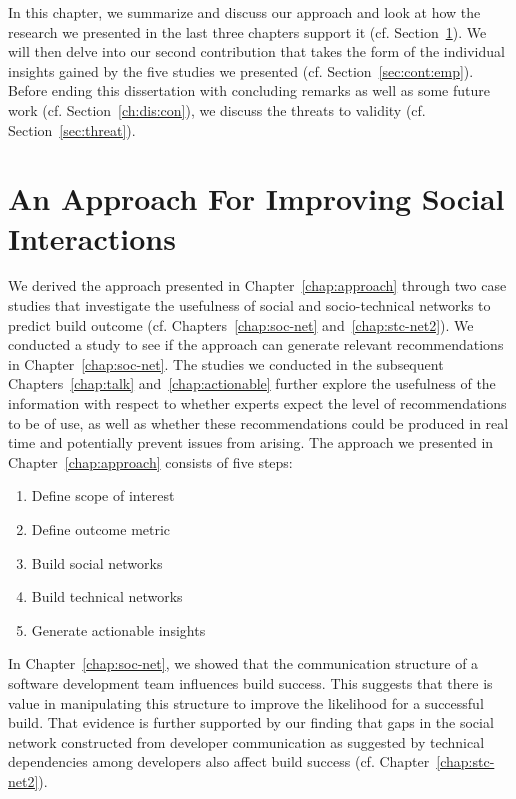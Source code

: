\label{chap:disc}
\vspace{-5pt}
In this chapter, we summarize and discuss our approach and look at how the research we presented in the last three chapters support it (cf. Section~\ref{ch:dis:app}).
We will then delve into our second contribution that takes the form of the individual insights gained by the five studies we presented (cf. Section~\ref{sec:cont:emp}).
Before ending this dissertation with concluding remarks as well as some future work (cf. Section~\ref{ch:dis:con}), we discuss the threats to validity (cf. Section~\ref{sec:threat}).

\vspace{-5pt}
\section{An Approach For Improving Social Interactions}
\label{ch:dis:app}
\vspace{-5pt}
We derived the approach presented in Chapter~\ref{chap:approach} through two case studies that investigate the usefulness of social and socio-technical networks to predict build outcome (cf. Chapters~\ref{chap:soc-net} and~\ref{chap:stc-net2}).
We conducted a study to see if the approach can generate relevant recommendations in Chapter~\ref{chap:soc-net}.
The studies we conducted in the subsequent Chapters~\ref{chap:talk} and~\ref{chap:actionable} further explore the usefulness of the information with respect to whether experts expect the level of recommendations to be of use, as well as whether these recommendations could be produced in real time and potentially prevent issues from arising.
The approach we presented in Chapter~\ref{chap:approach} consists of five steps:

\begin{enumerate}
\item Define scope of interest
\item Define outcome metric
\item Build social networks
\item Build technical networks
\item Generate actionable insights
\end{enumerate}

In Chapter~\ref{chap:soc-net}, we showed that the communication structure of a software development team influences build success.
This suggests that there is value in manipulating this structure to improve the likelihood for a successful build.
That evidence is further supported by our finding that gaps in the social network constructed from developer communication as suggested by technical dependencies among developers also affect build success (cf. Chapter~\ref{chap:stc-net2}).

